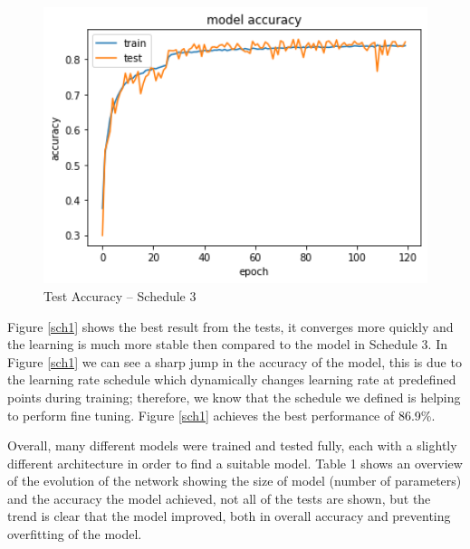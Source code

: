 \documentclass[12pt]{article}
\begin{document}
\begin{figure}[htbp]
\begin{minipage}{0.33\textwidth}
    \includegraphics[width=1\textwidth]{results/acc-8.png} %
    \caption{Test Accuracy -- Schedule 3}
    \label{sch3}
  \end{minipage}
\end{figure}

Figure \ref{sch1} shows the best result from the tests, it converges more quickly and the learning is much more stable then compared to the model in Schedule 3. In Figure \ref{sch1} we can see a sharp jump in the accuracy of the model, this is due to the learning rate schedule which dynamically changes learning rate at predefined points during training; therefore, we know that the schedule we defined is helping to perform fine tuning. Figure \ref{sch1} achieves the best performance of 86.9\%.

Overall, many different models were trained and tested fully, each with a slightly different architecture in order to find a suitable model. Table 1 shows an overview of the evolution of the network showing the size of model (number of parameters) and the accuracy the model achieved, not all of the tests are shown, but the trend is clear that the model improved, both in overall accuracy and preventing overfitting of the model.
\end{document}

